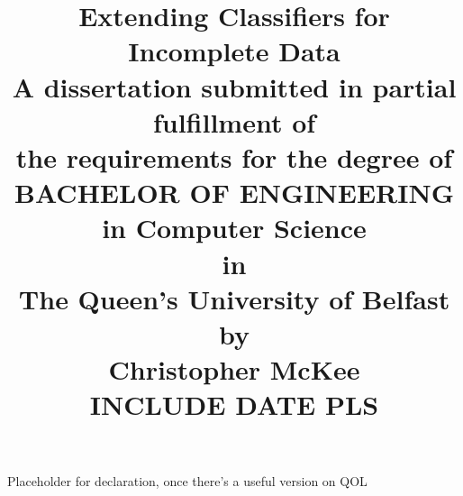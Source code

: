 \documentclass[12pt,a4paper]{report}
\begin{document}
\title{Extending Classifiers for Incomplete Data\\
\large
A dissertation submitted in partial fulfillment of\\
the requirements for the degree of\\
BACHELOR OF ENGINEERING in Computer Science\\
in\\
The Queen's University of Belfast\\
by\\
Christopher McKee\\
INCLUDE DATE PLS}
\maketitle
\newpage
Placeholder for declaration, once there's a useful version on QOL





\end{document}
